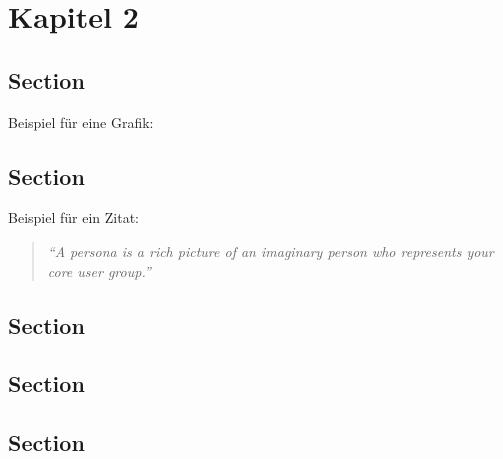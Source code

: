 \chapter{Kapitel 2}

\section{Section}
\label{sec:section}

Beispiel für eine Grafik:

\section{Section}
Beispiel für ein Zitat:
\begin{quotation}
	\textit{\enquote{A persona is a rich picture of an imaginary person who represents your core user group.}} \cite{Dix04}
\end{quotation}


\section{Section}

\section{Section}

\section{Section}